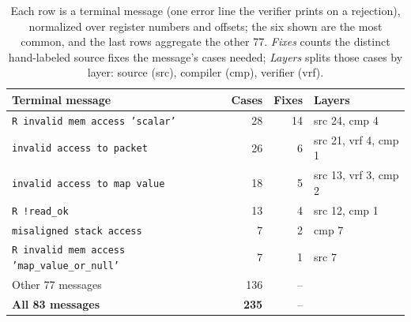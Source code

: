 \begin{table}[t]
  \centering
  \caption{Each row is a terminal message (one error line the verifier prints on a rejection), normalized over register numbers and offsets; the six shown are the most common, and the last rows aggregate the other 77. \emph{Fixes} counts the distinct hand-labeled source fixes the message's cases needed; \emph{Layers} splits those cases by layer: source (src), compiler (cmp), verifier (vrf).}
  \label{tab:rejection-classes}
  \footnotesize
  \setlength{\tabcolsep}{3pt}
  \begin{tabular}{@{}>{\raggedright\arraybackslash}p{4.2cm} r r >{\raggedright\arraybackslash}p{2.3cm}@{}}
    \toprule
    Terminal message & Cases & Fixes & Layers \\
    \midrule
    \texttt{R invalid mem access 'scalar'}               &  28 & 14 & src 24, cmp 4 \\
    \texttt{invalid access to packet}                    &  26 &  6 & src 21, vrf 4, cmp 1 \\
    \texttt{invalid access to map value}                 &  18 &  5 & src 13, vrf 3, cmp 2 \\
    \texttt{R !read\_ok}                                 &  13 &  4 & src 12, cmp 1 \\
    \texttt{misaligned stack access}                     &   7 &  2 & cmp 7 \\
    \texttt{R invalid mem access 'map\_value\_or\_null'} &   7 &  1 & src 7 \\
    \midrule
    Other 77 messages                                    & 136 & -- & \\
    \textbf{All 83 messages}                             & \textbf{235} & -- & \\
    \bottomrule
  \end{tabular}
\end{table}